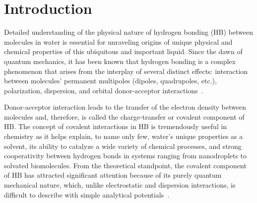 \documentclass[aps,prl,reprint,amsmath,amssymb]{revtex4-1}
\begin{document}
\maketitle

\section{Introduction} 

Detailed understanding of the physical nature of hydrogen bonding (HB) between molecules in water is essential for unraveling origins of unique physical and chemical properties of this ubiquitous and important liquid. 
Since the dawn of quantum mechanics, it has been known that hydrogen bonding is a complex phenomenon that arises from the interplay of several distinct effects: interaction between molecules’ permanent multipoles (dipoles, quadrupoles, etc.), polarization, dispersion, and orbital donor-acceptor interactions~\cite{eisenberg2005structure}.

Donor-acceptor interaction leads to the transfer of the electron density between molecules and, therefore, is called the charge-transfer or covalent component of HB. 
The concept of covalent interactions in HB is tremendously useful in chemistry 
as it helps explain, to name only few, water's unique properties as a solvent, its ability to catalyze a wide variety of chemical processes, and strong cooperativity between hydrogen bonds in systems ranging from nanodroplets to solvated biomolecules. 
From the theoretical standpoint, the covalent component of HB has attracted significant attention because of its purely quantum mechanical nature, which, unlike electrostatic and dispersion interactions, is difficult to describe with simple analytical potentials~\cite{lee2011ctpotential, gordon2013ctefp}.

\end{document}
